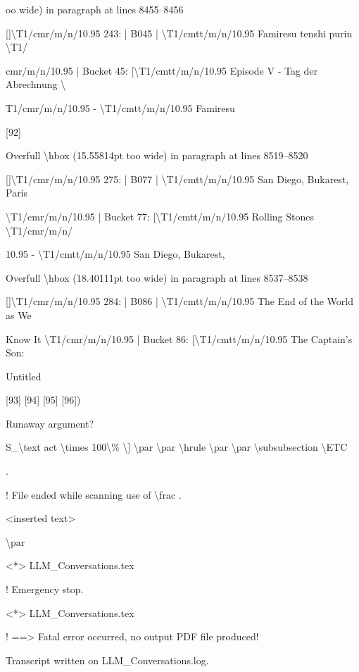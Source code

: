 \documentclass[11pt,a4paper]{article}
\begin{document}
{{oo wide) in paragraph at lines 8455--8456

[]\textbackslash{}T1/cmr/m/n/10.95 243: | B045 | \textbackslash{}T1/cmtt/m/n/10.95 Famiresu tenshi purin \textbackslash{}T1/

cmr/m/n/10.95 | Bucket 45: [\textbackslash{}T1/cmtt/m/n/10.95 Episode V - Tag der Abrechnung \textbackslash{}

T1/cmr/m/n/10.95 - \textbackslash{}T1/cmtt/m/n/10.95 Famiresu

[92]

Overfull \textbackslash{}hbox (15.55814pt too wide) in paragraph at lines 8519--8520

[]\textbackslash{}T1/cmr/m/n/10.95 275: | B077 | \textbackslash{}T1/cmtt/m/n/10.95 San Diego, Bukarest, Paris

\textbackslash{}T1/cmr/m/n/10.95 | Bucket 77: [\textbackslash{}T1/cmtt/m/n/10.95 Rolling Stones \textbackslash{}T1/cmr/m/n/

10.95 - \textbackslash{}T1/cmtt/m/n/10.95 San Diego, Bukarest,


Overfull \textbackslash{}hbox (18.40111pt too wide) in paragraph at lines 8537--8538

[]\textbackslash{}T1/cmr/m/n/10.95 284: | B086 | \textbackslash{}T1/cmtt/m/n/10.95 The End of the World as We

Know It \textbackslash{}T1/cmr/m/n/10.95 | Bucket 86: [\textbackslash{}T1/cmtt/m/n/10.95 The Captain's Son:

Untitled

[93] [94] [95] [96])

Runaway argument?

{S\_{\textbackslash{}text {act}} \textbackslash{}times 100\textbackslash{}\% \textbackslash{}] \textbackslash{}par \textbackslash{}par \textbackslash{}hrule \textbackslash{}par \textbackslash{}par \textbackslash{}subsubsection \textbackslash{}ETC

.

! File ended while scanning use of \textbackslash{}frac .

<inserted text>

\textbackslash{}par

<*> LLM\_Conversations.tex


! Emergency stop.

<*> LLM\_Conversations.tex


!  ==> Fatal error occurred, no output PDF file produced!

Transcript written on LLM\_Conversations.log.


}}}
\end{document}
